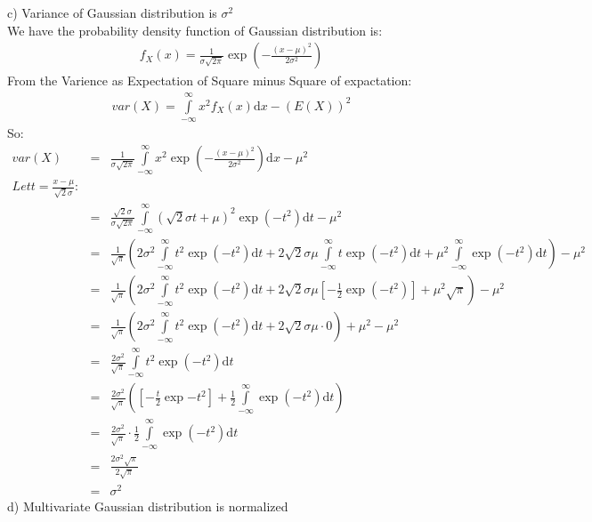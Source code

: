 \documentclass{article}
\begin{document}
c) Variance of Gaussian distribution is $\sigma^2$\\
We have the probability density function of Gaussian distribution is:\\
\begin{align*}
    f_X(x) = \frac{1}{\sigma\sqrt{2\pi}} \exp{(-\frac{(x-\mu)^2}{2\sigma^2})}
\end{align*}
From the Varience as Expectation of Square minus Square of expactation:\\
\begin{align*}
    var(X) = \displaystyle\int\limits_{-\infty}^{\infty} x^2f_X(x)\mathrm{d}x - (E(X))^2
\end{align*}
So:
\begin{eqnarray*}
    var(X) & = & \frac{1}{\sigma\sqrt{2\pi}} \displaystyle\int\limits_{-\infty}^{\infty} x^2 \exp{(-\frac{(x-\mu)^2}{2\sigma^2})}\mathrm{d}x - \mu^2\\
    Let t = \frac{x-\mu}{\sqrt{2}\sigma}:\\
    & = & \frac{\sqrt{2}\sigma}{\sigma\sqrt{2\pi}} \displaystyle\int\limits_{-\infty}^{\infty} (\sqrt{2}\sigma t + \mu)^2 \exp{(-t^2)}\mathrm{d}t - \mu^2\\
    & = & \frac{1}{\sqrt{\pi}}(2\sigma^2 \displaystyle\int\limits_{-\infty}^{\infty} t^2 \exp{(-t^2)} \mathrm{d}t + 2\sqrt{2}\sigma\mu \displaystyle\int\limits_{-\infty}^{\infty}t \exp{(-t^2)} \mathrm{d}t + \mu^2\displaystyle\int\limits_{-\infty}^{\infty}\exp{(-t^2)\mathrm{d}t}) - \mu^2\\
    & = & \frac{1}{\sqrt{\pi}}(2\sigma^2 \displaystyle\int\limits_{-\infty}^{\infty} t^2 \exp{(-t^2)} \mathrm{d}t + 2\sqrt{2}\sigma\mu[-\frac{1}{2}\exp{(-t^2)}] + \mu^2\sqrt{\pi}) - \mu^2\\
    & = & \frac{1}{\sqrt{\pi}}(2\sigma^2 \displaystyle\int\limits_{-\infty}^{\infty} t^2 \exp{(-t^2)} \mathrm{d}t + 2\sqrt{2}\sigma\mu\cdot 0) + \mu^2 - \mu^2\\
    & = & \frac{2\sigma^2}{\sqrt{\pi}} \displaystyle\int\limits_{-\infty}^{\infty} t^2 \exp{(-t^2)} \mathrm{d}t\\
    & = & \frac{2\sigma^2}{\sqrt{\pi}} ([-\frac{t}{2}\exp{-t^2}] + \frac{1}{2}\displaystyle\int\limits_{-\infty}^{\infty}\exp{(-t^2)}\mathrm{d}t)\\
    & = & \frac{2\sigma^2}{\sqrt{\pi}} \cdot \frac{1}{2} \displaystyle\int\limits_{-\infty}^{\infty}\exp{(-t^2)} \mathrm{d}t\\
    & = & \frac{2\sigma^2\sqrt{\pi}}{2\sqrt{\pi}}\\
    & = & \sigma^2
\end{eqnarray*}
d) Multivariate Gaussian distribution is normalized
\end{document}

